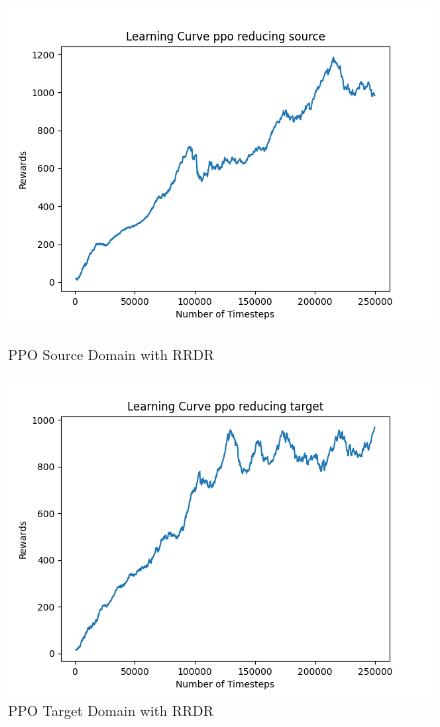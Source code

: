 \documentclass[11pt]{article}
\begin{document}
\begin{figure}[H]
    \vfill
    \begin{minipage}{0.45\textwidth}
        \centering
        \includegraphics[width=\textwidth]{../images/Learning_curve_PPO_reducing_Source.png}
        \caption{PPO Source Domain with RRDR}
        \label{fig:ppo_source_rrdr}
    \end{minipage}
    \hfill
    \begin{minipage}{0.45\textwidth}
        \centering
        \includegraphics[width=\textwidth]{../images/Learning_curve_PPO_reducing_Target.png}
        \caption{PPO Target Domain with RRDR}
        \label{fig:ppo_target_rrdr}
    \end{minipage}

\end{figure}
\end{document}
